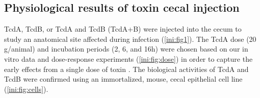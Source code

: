 \begin{table}[h!]
\centering
\begin{adjustwidth}{-1cm}{}
\end{adjustwidth}
\caption[Survival in cecal injection experiments]
    {\textbf{Survival in cecal injection experiments}
The ``15/16*'' in the table are the mice shown in
\autoref{ini:fig:dose}. Only four of these mice were given 20 \textmugreek{}g, and
only these four are included in the ``Totals''. The one mouse that did not
survive in the dose response experiment was given 5\textmugreek{}g of TcdA.
The TECHLAB\textsuperscript{\textregistered{}} lot numbers 
of the toxins used are given in the last two columns. Mice used for microarrays
and all protein measurements were from experiments 1 and 2. The numbers
give the fraction of survivors in each sample group (\# survivors/total mice).}
\label{ini:tab:sizes}
\end{table}


\subsection{ Physiological results of toxin cecal injection }
TcdA, TcdB, or TcdA and TcdB (TcdA+B) were injected into the cecum 
to study an anatomical site affected during infection (\autoref{ini:fig1}). 
The TcdA dose (20 \textmugreek{}g/animal) and incubation periods (2, 6, and 
16h) were chosen based on our in vitro data and dose-response experiments 
(\autoref{ini:fig:dose}) in order to capture the early effects from a 
single dose of toxin \cite{DAuria:2012bd}. The biological activities 
of TcdA and TcdB were confirmed using an immortalized, mouse, cecal 
epithelial cell line (\autoref{ini:fig:cells}).


